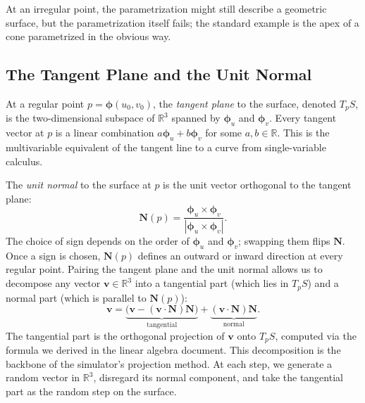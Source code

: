 \documentclass{article}
\begin{document}
At an irregular point, the parametrization might still describe a geometric surface, but the parametrization itself fails; the standard example is the apex of a cone parametrized in the obvious way.

\subsection{The Tangent Plane and the Unit Normal}

At a regular point $p = \boldsymbol{\phi}(u_0, v_0)$, the \textit{tangent plane} to the surface, denoted $T_p S$, is the two-dimensional subspace of $\mathbb{R}^3$ spanned by $\boldsymbol{\phi}_u$ and $\boldsymbol{\phi}_v$. Every tangent vector at $p$ is a linear combination $a \boldsymbol{\phi}_u + b \boldsymbol{\phi}_v$ for some $a, b \in \mathbb{R}$. This is the multivariable equivalent of the tangent line to a curve from single-variable calculus.

The \textit{unit normal} to the surface at $p$ is the unit vector orthogonal to the tangent plane:
$$\mathbf{N}(p) = \frac{\boldsymbol{\phi}_u \times \boldsymbol{\phi}_v}{|\boldsymbol{\phi}_u \times \boldsymbol{\phi}_v|}.$$
The choice of sign depends on the order of $\boldsymbol{\phi}_u$ and $\boldsymbol{\phi}_v$; swapping them flips $\mathbf{N}$. Once a sign is chosen, $\mathbf{N}(p)$ defines an outward or inward direction at every regular point. Pairing the tangent plane and the unit normal allows us to decompose any vector $\mathbf{v} \in \mathbb{R}^3$ into a tangential part (which lies in $T_p S$) and a normal part (which is parallel to $\mathbf{N}(p)$):
$$\mathbf{v} = \underbrace{\big( \mathbf{v} - (\mathbf{v} \cdot \mathbf{N}) \mathbf{N} \big)}_{\text{tangential}} + \underbrace{(\mathbf{v} \cdot \mathbf{N}) \mathbf{N}}_{\text{normal}}.$$
The tangential part is the orthogonal projection of $\mathbf{v}$ onto $T_p S$, computed via the formula we derived in the linear algebra document. This decomposition is the backbone of the simulator's projection method. At each step, we generate a random vector in $\mathbb{R}^3$, disregard its normal component, and take the tangential part as the random step on the surface.
\end{document}
